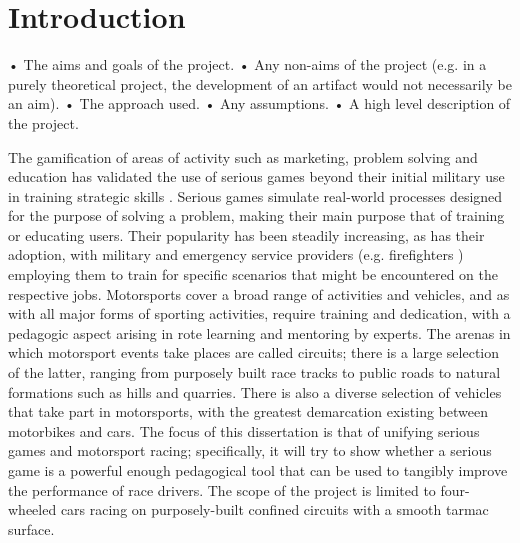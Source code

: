\section{Introduction}

• The aims and goals of the project.
• Any non-aims of the project (e.g. in a purely theoretical project, the development of an artifact would not necessarily be an aim).
• The approach used.
• Any assumptions.
• A high level description of the project.

The gamification of areas of activity such as marketing, problem solving and education \cite{michael2005serious} has validated the use of serious games beyond their initial military use in training strategic skills \cite{djaouti2011classifying}.  Serious games simulate real-world processes designed for the purpose of solving a problem, making their main purpose that of training or educating users. Their popularity has been steadily increasing, as has their adoption, with military \cite{djaouti2011classifying} and emergency service providers (e.g. firefighters \cite{michael2005serious}) employing them to train for specific scenarios that might be encountered on the respective jobs. Motorsports cover a broad range of activities and vehicles, and as with all major forms of sporting activities, require training and dedication, with a pedagogic aspect arising in rote learning and mentoring by experts. The arenas in which motorsport events take places are called circuits; there is a large selection of the latter, ranging from purposely built race tracks to public roads to natural formations such as hills and quarries. There is also a diverse selection of vehicles that take part in motorsports, with the greatest demarcation existing between motorbikes and cars. The focus of this dissertation is that of unifying serious games and motorsport racing; specifically, it will try to show whether a serious game is a powerful enough pedagogical tool that can be used to tangibly improve the performance of race drivers. The scope of the project is limited to four-wheeled cars racing on purposely-built confined circuits with a smooth tarmac surface.  

